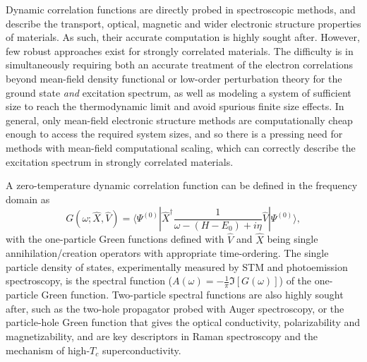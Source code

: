 \documentclass[aps,twocolumn,nobibnotes]{revtex4}
\begin{document}
Dynamic correlation functions are directly probed in spectroscopic methods,
and describe the transport, optical, magnetic and wider electronic structure properties of materials. 
As such, their accurate computation is highly sought after. 
However, few robust approaches exist for strongly correlated materials\cite{Gali2013}. The difficulty is in simultaneously requiring both an accurate 
treatment of the electron correlations beyond mean-field density functional or low-order perturbation theory for the ground state {\em and} excitation spectrum, as well as modeling 
a system of sufficient size to reach the thermodynamic limit and avoid spurious finite size effects. 
In general, only mean-field electronic structure methods are computationally cheap enough to access the required system
sizes, and so there is a pressing need for methods with mean-field computational scaling, which can correctly describe 
the excitation spectrum in strongly correlated materials.

A zero-temperature dynamic correlation function can be defined in the frequency domain as
\begin{equation}
    G(\omega;{\hat X},{\hat V}) = \langle \Psi^{(0)} | {\hat X}^{\dagger} \frac{1}{\omega-(H-E_0)+i \eta} {\hat V} | \Psi^{(0)} \rangle , \label{eqn:intCorrFunc}
\end{equation}
with the one-particle Green functions defined with ${\hat V}$ and ${\hat X}$ being single annihilation/creation operators 
with appropriate time-ordering. 
The single particle
density of states, experimentally measured by STM 
and photoemission spectroscopy, is the spectral function ($A(\omega)=-\frac{1}{\pi}\Im[G(\omega)]$) of the one-particle Green function. 
Two-particle spectral functions are also highly sought after, such as the two-hole propagator 
probed with Auger spectroscopy\cite{Mona2013}, or the particle-hole Green function that gives the optical conductivity, polarizability and
magnetizability, and are key descriptors in 
Raman spectroscopy and the mechanism of high-$T_c$ superconductivity\cite{Millis2012,Sordi2012,Millis2013}.
\end{document}
